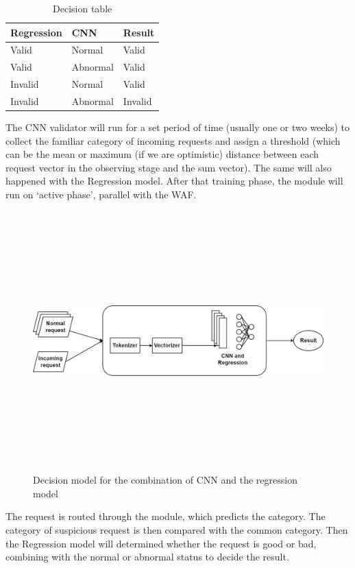 \begin{table}[h]
  \centering
  \begin{tabular}{lll}
  \hline
  \textbf{Regression} & \textbf{CNN}      & \textbf{Result}  \\ \hline
  Valid      & Normal   & Valid   \\
  Valid      & Abnormal & Valid   \\
  Invalid    & Normal   & Valid   \\
  Invalid    & Abnormal & Invalid \\ \hline
  \end{tabular}
  \caption{\label{demo-table} Decision table}
  \end{table}

The CNN validator will run for a set period of time (usually one or two weeks) to collect the familiar category of incoming requests and assign a threshold (which can be the mean or maximum (if we are optimistic) distance between each request vector in the observing stage and the sum vector). The same will also happened with the Regression model. After that training phase, the module will run on `active phase', parallel with the WAF. 

\begin{figure}[!h]
     \centering
     \includegraphics[width=\linewidth, height=10cm,keepaspectratio]{figures/decision model.png}
   \caption{Decision model for the combination of CNN and the regression model}
\end{figure}

The request is routed through the module, which predicts the category. The category of suspicious request is then compared with the common category. Then the Regression model will determined whether the request is good or bad, combining with the normal or abnormal status to decide the result. 
